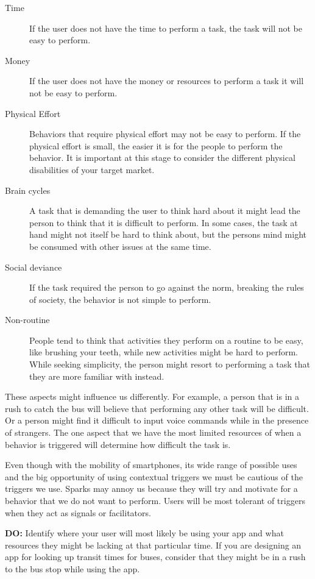\begin{description}
  \item[Time] If the user does not have the time to perform a task, the task will not be easy to perform.
  \item[Money] If the user does not have the money or resources to perform a task it will not be easy to perform.
  \item[Physical Effort] Behaviors that require physical effort may not be easy to perform. If the physical effort is small, the easier it is for the people to perform the behavior. It is important at this stage to consider the different physical disabilities of your target market.
  \item[Brain cycles] A task that is demanding the user to think hard about it might lead the person to think that it is difficult to perform. In some cases, the task at hand might not itself be hard to think about, but the persons mind might be consumed with other issues at the same time.
  \item[Social deviance] If the task required the person to go against the norm, breaking the rules of society, the behavior is not simple to perform.
  \item[Non-routine] People tend to think that activities they perform on a routine to be easy, like brushing your teeth, while new activities might be hard to perform. While seeking simplicity, the person might resort to performing a task that they are more familiar with instead.
\end{description}

These aspects might influence us differently. For example, a person that is in a rush to catch the bus will believe that performing any other task will be difficult. Or a person might find it difficult to input voice commands while in the presence of strangers. The one aspect that we have the most limited resources of when a behavior is triggered will determine how difficult the task is.

Even though with the mobility of smartphones, its wide range of possible uses and the big opportunity of using contextual triggers we must be cautious of the triggers we use. Sparks may annoy us because they will try and motivate for a behavior that we do not want to perform. Users will be most tolerant of triggers when they act as signals or facilitators.

\begin{displayquote}
  \textbf{DO:} Identify where your user will most likely be using your app and what resources they might be lacking at that particular time. If you are designing an app for looking up transit times for buses, consider that they might be in a rush to the bus stop while using the app.
\end{displayquote}

